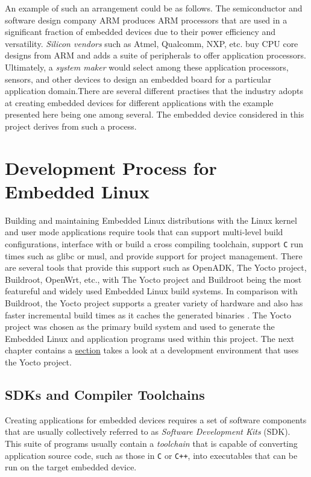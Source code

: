 An example of such an arrangement could be as follows. The semiconductor and software design company ARM produces ARM processors that are used in a significant fraction of embedded devices due to their power efficiency and versatility. \textit{Silicon vendors} such as Atmel, Qualcomm, NXP, etc. buy CPU core designs from ARM and adds a suite of peripherals to offer application processors. Ultimately, a \textit{system maker} would select among these application processors, sensors, and other devices to design an embedded board for a particular application domain.There are several different practises that the industry adopts at creating embedded devices for different applications with the example presented here being one among several. The embedded device considered in this project derives from such a process.

\section{Development Process for Embedded Linux}

Building and maintaining Embedded Linux distributions with the Linux kernel and user mode applications require tools that can support multi-level build configurations, interface with or build a cross compiling toolchain, support \texttt{C} run times such as glibc or musl, and provide support for project management. There are several tools that provide this support such as OpenADK, The Yocto project, Buildroot, OpenWrt, etc., with The Yocto project and Buildroot being the most featureful and widely used Embedded Linux build systems. In comparison with Buildroot, the Yocto project supports a greater variety of hardware and also has faster incremental build times as it caches the generated binaries \cite{yocto}. The Yocto project was chosen as the primary build system and used to generate the Embedded Linux and application programs used within this project. The next chapter contains a \hyperref[section:yocto-demo]{section} takes a look at a development environment that uses the Yocto project.

\subsection{SDKs and Compiler Toolchains}

Creating applications for embedded devices requires a set of software components that are usually collectively referred to as \textit{Software Development Kits} (SDK). This suite of programs usually contain a \textit{toolchain} that is capable of converting application source code, such as those in \texttt{C}  or \texttt{C++}, into executables that can be run on the target embedded device.

